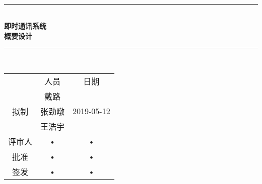 \documentclass[bachelor]{ustcthesis}
\newcommand{\HRule}{\rule{\linewidth}{0.5mm}}
\begin{document}
\begin{titlepage}
\begin{center}
~\\[5cm]
\HRule \\[0.4cm]
{\huge \bfseries 即时通讯系统\\概要设计}\\[0.4cm]
\HRule \\[1.5cm]

\begin{tabular}{ccc}
      & 人员 & 日期 \\ 
      &  戴路  &  \\ 
拟制  &  张劲暾 & 2019-05-12 \\ 
      &  王浩宇 &  \\ 
评审人 & • & • \\ 
批准 & • & • \\ 
签发 & • & • \\ 
\end{tabular} 

\end{center}
\end{titlepage}

\frontmatter

\tableofcontents
\listoffigures
\listoftables
% 

\mainmatter











% 
% 
% 
% 
% 
\nocite{*}

\end{document}
